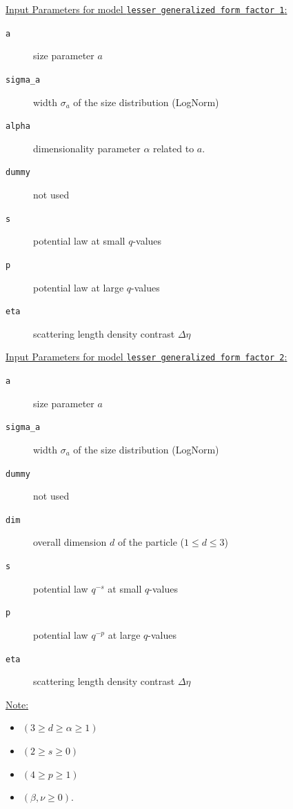 \underline{Input Parameters for model \texttt{lesser generalized form factor 1}:}\\
\begin{description}
\item[\texttt{a}] size parameter $a$
\item[\texttt{sigma\_a}] width $\sigma_a$ of the size distribution (LogNorm)
\item[\texttt{alpha}] dimensionality parameter $\alpha$ related to $a$.
\item[\texttt{dummy}] not used
\item[\texttt{s}] potential law at small $q$-values
\item[\texttt{p}] potential law at large $q$-values
\item[\texttt{eta}] scattering length density contrast $\Delta\eta$
\end{description}

\vspace{5mm}

\underline{Input Parameters for model \texttt{lesser generalized form factor 2}:}\\
\begin{description}
\item[\texttt{a}] size parameter $a$
\item[\texttt{sigma\_a}] width $\sigma_a$ of the size distribution (LogNorm)
\item[\texttt{dummy}] not used
\item[\texttt{dim}] overall dimension $d$ of the particle ($1\leq d\leq 3$)
\item[\texttt{s}] potential law $q^{-s}$ at small $q$-values
\item[\texttt{p}] potential law $q^{-p}$ at large $q$-values
\item[\texttt{eta}] scattering length density contrast $\Delta\eta$
\end{description}

\vspace{5mm}

\underline{Note:}
\begin{itemize}
\item $(3\geq d\geq \alpha\geq 1)$
\item $(2\geq s\geq 0)$
\item  $(4\geq p \geq 1)$
\item $(\beta,\nu\geq 0)$.
\end{itemize}


